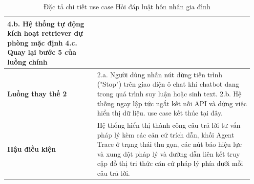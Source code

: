 \documentclass[../DoAn.tex]{subfiles}
\begin{document}
\begin{table}[H]
\begin{tabular}{|p{3.5cm}|p{11.5cm}|}
4.b. Hệ thống tự động kích hoạt retriever dự phòng mặc định \newline
4.c. Quay lại bước 5 của luồng chính\\ \hline
\textbf{Luồng thay thế 2} &
2.a. Người dùng nhấn nút dừng tiến trình ("Stop") trên giao diện ô chat khi chatbot đang trong quá trình suy luận hoặc sinh text. \newline
2.b. Hệ thống ngay lập tức ngắt kết nối API và dừng việc hiển thị dữ liệu. use case kết thúc tại đây. \\ \hline
\textbf{Hậu điều kiện} & Hệ thống hiển thị thành công câu trả lời tư vấn pháp lý kèm các căn cứ trích dẫn, khối Agent Trace ở trạng thái thu gọn, các nút báo hiệu lực và xung đột pháp lý và đường dẫn liên kết truy cập đồ thị tri thức căn cứ pháp lý phía dưới mỗi câu trả lời.\\ \hline
\end{tabular}
\caption{Đặc tả chi tiết use case Hỏi đáp luật hôn nhân gia đình}
\label{table:uc_specs_qa}
\end{table}
\end{document}
